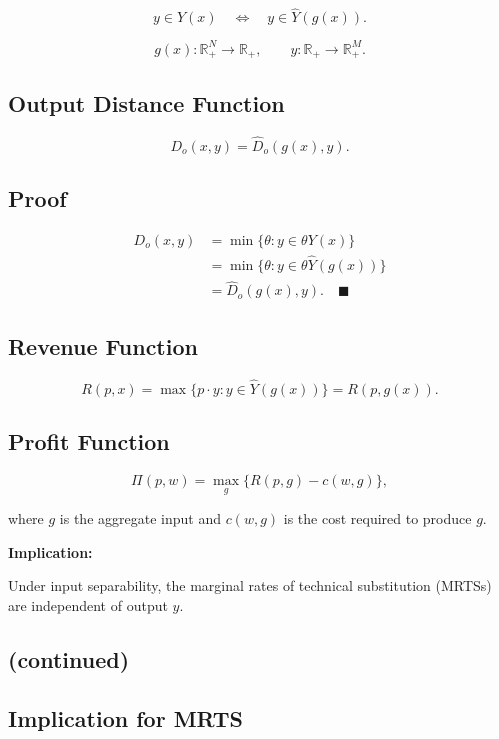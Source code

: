 \[
y \in Y(x) \quad \Longleftrightarrow \quad y \in \hat Y(g(x)).
\]

\[
g(x): \mathbb{R}_+^N \to \mathbb{R}_+,
\qquad
y: \mathbb{R}_+ \to \mathbb{R}_+^M.
\]

\subsection*{Output Distance Function}

\[
D_o(x,y)=\hat D_o(g(x),y).
\]

\subsection*{Proof}

\[
\begin{aligned}
D_o(x,y)
&=
\min \{\theta : y \in \theta Y(x)\}\\
&=
\min \{\theta : y \in \theta \hat Y(g(x))\}\\
&=
\hat D_o(g(x),y).
\quad \blacksquare
\end{aligned}
\]

\subsection*{Revenue Function}

\[
R(p,x)
=
\max \{p\cdot y : y \in \hat Y(g(x))\}
=
R(p,g(x)).
\]

\subsection*{Profit Function}

\[
\Pi(p,w)
=
\max_g \{R(p,g) - c(w,g)\},
\]

where $g$ is the aggregate input and $c(w,g)$ is the cost required to produce $g$.

\medskip

\textbf{Implication:}

Under input separability, the marginal rates of technical substitution (MRTSs)
are independent of output $y$.



\subsection*{(continued)}

\subsection*{Implication for MRTS}

